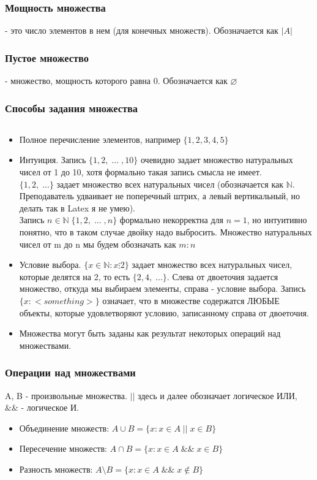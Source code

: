 \subsubsection{Мощность множества}
- это число элементов в нем (для конечных множеств). Обозначается как $|A|$
\subsubsection{Пустое множество} - множество, мощность которого равна 0. Обозначается как $\varnothing$
\subsubsection{Способы задания множества}
$\;$ \\
\begin{itemize}
\item Полное перечисление элементов, например $\{1, 2, 3, 4, 5\}$
\item Интуиция. Запись $\{1, 2, \; ... \;, 10\}$ очевидно задает множество натуральных чисел от 1 до 10, хотя формально такая запись смысла не имеет. \\ $\{1, 2, \; ...\}$ задает множество всех натуральных чисел (обозначается как $\mathbb{N}$. Преподаватель удваивает не поперечный штрих, а левый вертикальный, но делать так в Latex я не умею). \\ Запись $n \in \mathbb{N} \; \{1, 2, \; ... \; , n\}$ формально некорректна для $n = 1$, но интуитивно понятно, что в таком случае двойку надо выбросить. Множество натуральных чисел от m до n мы будем обозначать как $m:n$
\item Условие выбора. $\{x \in \mathbb{N} : x \vdots 2\}$ задает множество всех натуральных чисел, которые делятся на 2, то есть $\{2, 4, \; ... \}$. Слева от двоеточия задается множество, откуда мы выбираем элементы, справа - условие выбора. Запись $\{x: <something>\}$ означает, что в множестве содержатся ЛЮБЫЕ объекты, которые удовлетворяют условию, записанному справа от двоеточия.
\item Множества могут быть заданы как результат некоторых операций над множествами.
\end{itemize}
\subsubsection{Операции над множествами}
$\;$ \\ A, B - произвольные множества. $||$ здесь и далее обозначает логическое ИЛИ, $\&\&$ - логическое И.\\
\begin{itemize}
\item Объединение множеств: $A \cup B = \{x : x \in A \;||\; x \in B\}$
\item Пересечение множеств: $A \cap B = \{x : x \in A \;\&\&\; x \in B\}$
\item Разность множеств: $A \setminus B = \{x : x \in A \;\&\&\; x \not\in B\}$
\end{itemize}

